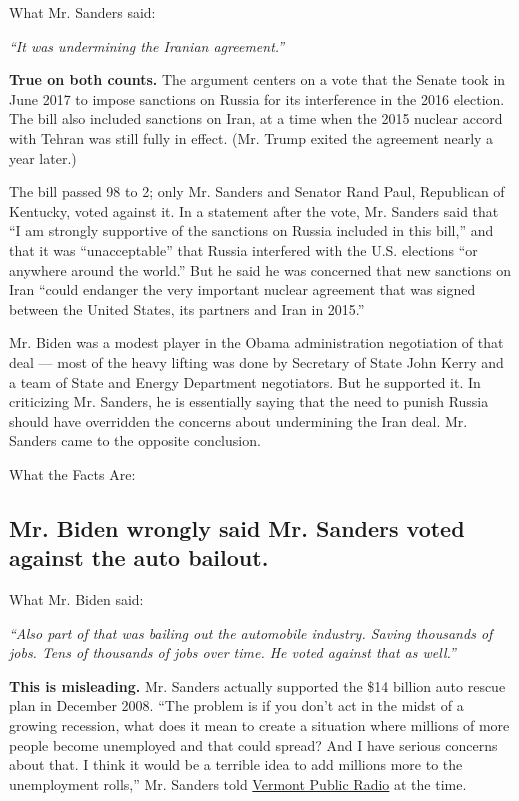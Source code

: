 What Mr. Sanders said:

\emph{``It was undermining the Iranian agreement.''}

\textbf{True on both counts.} The argument centers on a vote that the
Senate took in June 2017 to impose sanctions on Russia for its
interference in the 2016 election. The bill also included sanctions on
Iran, at a time when the 2015 nuclear accord with Tehran was still fully
in effect. (Mr. Trump exited the agreement nearly a year later.)

The bill passed 98 to 2; only Mr. Sanders and Senator Rand Paul,
Republican of Kentucky, voted against it. In a statement after the vote,
Mr. Sanders said that ``I am strongly supportive of the sanctions on
Russia included in this bill,'' and that it was ``unacceptable'' that
Russia interfered with the U.S. elections ``or anywhere around the
world.'' But he said he was concerned that new sanctions on Iran ``could
endanger the very important nuclear agreement that was signed between
the United States, its partners and Iran in 2015.''

Mr. Biden was a modest player in the Obama administration negotiation of
that deal --- most of the heavy lifting was done by Secretary of State
John Kerry and a team of State and Energy Department negotiators. But he
supported it. In criticizing Mr. Sanders, he is essentially saying that
the need to punish Russia should have overridden the concerns about
undermining the Iran deal. Mr. Sanders came to the opposite conclusion.

What the Facts Are:

\hypertarget{mr-biden-wrongly-said-mr-sanders-voted-against-the-auto-bailout}{%
\subsection{Mr. Biden wrongly said Mr. Sanders voted against the auto
bailout.}\label{mr-biden-wrongly-said-mr-sanders-voted-against-the-auto-bailout}}

What Mr. Biden said:

\emph{``Also part of that was bailing out the automobile industry.
Saving thousands of jobs. Tens of thousands of jobs over time. He voted
against that as well.''}

\textbf{This is misleading.} Mr. Sanders actually supported the \$14
billion auto rescue plan in December 2008. ``The problem is if you don't
act in the midst of a growing recession, what does it mean to create a
situation where millions of more people become unemployed and that could
spread? And I have serious concerns about that. I think it would be a
terrible idea to add millions more to the unemployment rolls,'' Mr.
Sanders told
\href{https://archive.vpr.org/vpr-news/leahy-sanders-reluctantly-support-auto-industry-rescue/}{Vermont
Public Radio} at the time.

